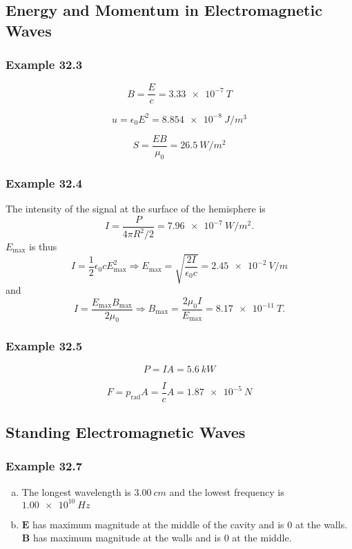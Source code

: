\documentclass{article}
\begin{document}
\subsection{Energy and Momentum in Electromagnetic Waves}

\subsubsection{Example 32.3}

\[B = \frac{E}{c} = \qty{3.33e-7}{T}\]

\[u = \epsilon_0 E^2 = \qty{8.854e-8}{J/m^3}\]

\[S = \frac{E B}{\mu_0} = \qty{26.5}{W/m^2}\]

\subsubsection{Example 32.4}

The intensity of the signal at the surface of the hemisphere is \[I = \frac{P}{4 \pi R^2 / 2} = \qty{7.96e-7}{W/m^2}.\] $E_\text{max}$ is thus \[I = \frac{1}{2} \epsilon_0 c E_\text{max}^2 \Rightarrow E_\text{max} = \sqrt{\frac{2 I}{\epsilon_0 c}} = \qty{2.45e-2}{V/m}\] and \[I = \frac{E_\text{max} B_\text{max}}{2 \mu_0} \Rightarrow B_\text{max} = \frac{2 \mu_0 I}{E_\text{max}} = \qty{8.17e-11}{T}.\]

\subsubsection{Example 32.5}

\[P = I A = \qty{5.6}{kW}\]

\[F = p_\text{rad} A = \frac{I}{c} A = \qty{1.87e-5}{N}\]

\subsection{Standing Electromagnetic Waves}

\subsubsection{Example 32.7}

\begin{enumerate}[(a)]
  \item The longest wavelength is $\qty{3.00}{cm}$ and the lowest frequency is $\qty{1.00e10}{Hz}$

  \item $\mathbf{E}$ has maximum magnitude at the middle of the cavity and is $0$ at the walls. $\mathbf{B}$ has maximum magnitude at the walls and is $0$ at the middle.
\end{enumerate}
\end{document}
